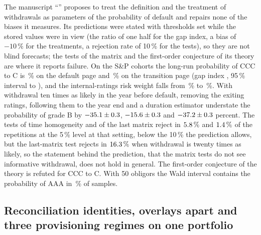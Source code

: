The manuscript ``\pxPaperTitleFour{}'' proposes to treat the definition and the treatment of withdrawals as parameters of the probability of default and
repairs none of the biases it measures. Its predictions were stated with thresholds set while the stored values were in view (the ratio of one half for the gap index,
a bias of $-10\,\%$ for the treatments, a rejection rate of 10\,\% for the tests), so they are not blind forecasts; the tests of the matrix and the first-order conjecture of
its theory are where it reports failure. On the S\&P cohorts the long-run probability of CCC to C is \pxPpFourCccDefault{}\,\% on the default page and \pxPpFourCccTransition{}\,\% on the
transition page (gap index \pxPpFourGapIndex{}, 95\,\% interval \pxPpFourGapLo{} to \pxPpFourGapHi{}), and the internal-ratings risk weight falls from \pxPpFourRwBefore{}\,\% to \pxPpFourRwAfter{}\,\%.
With withdrawal ten times as likely in the year before default, removing the exiting ratings, following them to the year end and a duration estimator understate the probability of
grade B by $-35.1\pm0.3$, $-15.6\pm0.3$ and $-37.2\pm0.3$ percent. The tests of time homogeneity and of the
last matrix reject in $5.8\,\%$ and $1.4\,\%$ of the repetitions at the 5\,\% level at that setting, below the 10\,\% the prediction allows, but the last-matrix test rejects in
$16.3\,\%$ when withdrawal is twenty times as likely, so the statement behind the prediction, that the matrix tests do not see informative withdrawal, does not hold in general. The
first-order conjecture of the theory is refuted for CCC to C. With 50 obligors the Wald interval contains the probability of AAA in \pxPpFourWald{}\,\% of samples.

\subsection{Reconciliation identities, overlays apart and three provisioning regimes on one portfolio}
\label{sec:bs5}

